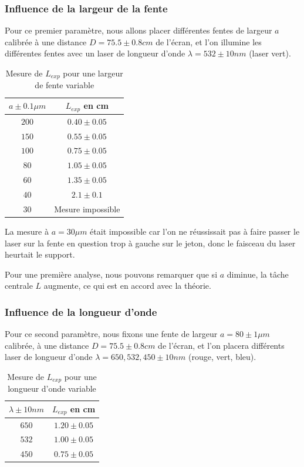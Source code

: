 \documentclass[12pt]{article}
\begin{document}
\subsubsection{Influence de la largeur de la fente}
Pour ce premier paramètre, nous allons placer différentes fentes de largeur $a$ calibrée à une distance $D = 75.5 \pm 0.8 cm$ de l'écran, et l'on illumine les différentes fentes avec un laser de longueur d'onde
$\lambda = 532 \pm 10nm$ (laser vert). 

\begin{table}[h!]
	\centering
	\begin{tabular}{||c c||} 
		\hline
		$a \pm 0.1 \mu m$ & $L_{exp}$ en cm \\
		\hline\hline
		\footnotesize
        $200$   &  $0.40     \pm 0.05$ \\ 
        $150$   &  $0.55    \pm 0.05$ \\ 
        $100$   &  $0.75    \pm 0.05$ \\ 
        $80$    &  $1.05    \pm 0.05$ \\ 
        $60$    &  $1.35    \pm 0.05$ \\ 
        $40$    &  $2.1     \pm 0.1$ \\ 
        $30$    &  Mesure impossible \\ 
		\hline
	\end{tabular}
	\caption{Mesure de $L_{exp}$ pour une largeur de fente variable}
	\label{table:1}
\end{table}

La mesure à $a = 30\mu m$ était impossible car l'on ne réussissait pas à faire passer le laser sur la fente en question trop à gauche sur le jeton, donc le faisceau du laser heurtait le support. 

Pour une première analyse, nous pouvons remarquer que si $a$ diminue, la tâche centrale $L$ augmente, ce qui est en accord avec la théorie.

\subsubsection{Influence de la longueur d'onde}
Pour ce second paramètre, nous fixons une fente de largeur $a = 80 \pm 1 \mu m$ calibrée, à une distance $D = 75.5 \pm 0.8 cm$ de l'écran, et l'on placera différents laser de longueur d'onde $\lambda = 650, 532, 450 \pm 10nm$ (rouge, vert, bleu).

\begin{table}[h!]
	\centering
	\begin{tabular}{||c c||} 
		\hline
		$\lambda \pm 10 nm$ & $L_{exp}$ en cm \\
		\hline\hline
		\footnotesize
        $650$   &  $1.20 \pm 0.05$ \\ 
        $532$   &  $1.00 \pm 0.05$ \\ 
        $450$   &  $0.75 \pm 0.05$ \\ 
		\hline
	\end{tabular}
	\caption{Mesure de $L_{exp}$ pour une longueur d'onde variable}
	\label{table:2}
\end{table}
\end{document}
